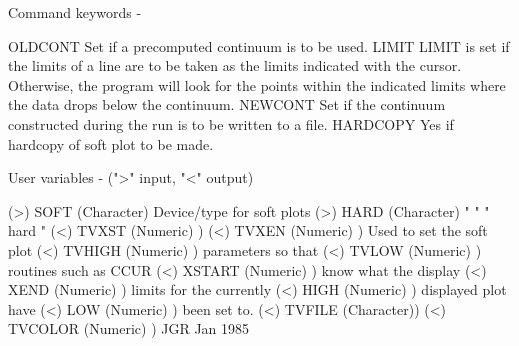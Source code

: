 \begin{description}
 Command keywords -

 OLDCONT     Set if a precomputed continuum is to be used.
 LIMIT       LIMIT is set if the limits of a line are to be
             taken as the limits indicated with the cursor.
             Otherwise, the program will look for the points
             within the indicated limits where the data drops
             below the continuum.
 NEWCONT     Set if the continuum constructed during the run
             is to be written to a file.
 HARDCOPY    Yes if hardcopy of soft plot to be made.

 User variables -  (">" input, "<" output)

 (>) SOFT    (Character) Device/type for soft plots
 (>) HARD    (Character)   "     "    "  hard  "
 (<) TVXST   (Numeric)  )
 (<) TVXEN   (Numeric)  ) Used to set the soft plot
 (<) TVHIGH  (Numeric)  ) parameters so that
 (<) TVLOW   (Numeric)  ) routines such as CCUR
 (<) XSTART  (Numeric)  ) know what the display
 (<) XEND    (Numeric)  ) limits for the currently
 (<) HIGH    (Numeric)  ) displayed plot have
 (<) LOW     (Numeric)  ) been set to.
 (<) TVFILE  (Character))
 (<) TVCOLOR (Numeric)  )
                                                JGR   Jan 1985
\end{description}
